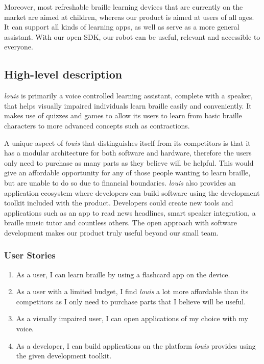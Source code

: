 \documentclass{article}
\begin{document}
Moreover, most refreshable braille learning devices that are currently on the market are aimed at children, whereas our product is aimed at users of all ages. It can support all kinds of learning apps, as well as serve as a more general assistant. With our open SDK, our robot can be useful, relevant and accessible to everyone.


\subsection{High-level description} 

\emph{louis} is primarily a voice controlled learning assistant, complete with a speaker, that helps visually impaired individuals learn braille easily and conveniently. It makes use of quizzes and games to allow its users to learn from basic braille characters to more advanced concepts such as contractions.

A unique aspect of \emph{louis} that distinguishes itself from its competitors is that it has a modular architecture for both software and hardware, therefore the users only need to purchase as many parts as they believe will be helpful. This would give an affordable opportunity for any of those people wanting to learn braille, but are unable to do so due to financial boundaries. \emph{louis} also provides an application ecosystem where developers can build software using the development toolkit included with the product. Developers could create new tools and applications such as an app to read news headlines, smart speaker integration, a braille music tutor and countless others. The open approach with software development makes our product truly useful beyond our small team.

\subsubsection{User Stories}

\begin{enumerate}
  \item As a user, I can learn braille by using a flashcard app on the device.
  \item As a user with a limited budget, I find \emph{louis} a lot more affordable than its competitors as I only need to purchase parts that I believe will be useful.
  \item As a visually impaired user, I can open applications of my choice with my voice.
  \item As a developer, I can build applications on the platform \emph{louis} provides using the given development toolkit.
\end{enumerate}
\end{document}
